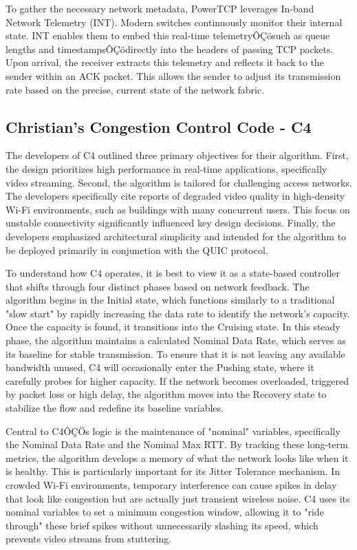 \documentclass[conference]{IEEEtran}
\begin{document}
To gather the necessary network metadata, PowerTCP leverages In-band Network Telemetry (INT)\cite{PowerTCP}. 
Modern switches continuously monitor their internal state.
INT enables them to embed this real-time telemetryÔÇösuch as queue lengths and timestampsÔÇödirectly into the headers of passing TCP packets. 
Upon arrival, the receiver extracts this telemetry and reflects it back to the sender within an ACK packet. 
This allows the sender to adjust its transmission rate based on the precise, current state of the network fabric.

\subsection{Christian's Congestion Control Code - C4}

The developers of C4 outlined three primary objectives for their algorithm\cite{C4BlogPost}. 
First, the design prioritizes high performance in real-time applications, specifically video streaming. 
Second, the algorithm is tailored for challenging access networks.
The developers specifically cite reports of degraded video quality in high-density Wi-Fi environments, such as buildings with many concurrent users. 
This focus on unstable connectivity significantly influenced key design decisions. 
Finally, the developers emphasized architectural simplicity and intended for the algorithm to be deployed primarily in conjunction with the QUIC protocol.

To understand how C4 operates, it is best to view it as a state-based controller that shifts through four distinct phases based on network feedback\cite{C4}. 
The algorithm begins in the Initial state, which functions similarly to a traditional "slow start" by rapidly increasing the data rate to identify the network's capacity. 
Once the capacity is found, it transitions into the Cruising state. In this steady phase, the algorithm maintains a calculated Nominal Data Rate, which serves as its baseline for stable transmission. 
To ensure that it is not leaving any available bandwidth unused, C4 will occasionally enter the Pushing state, where it carefully probes for higher capacity. 
If the network becomes overloaded, triggered by packet loss or high delay, the algorithm moves into the Recovery state to stabilize the flow and redefine its baseline variables.

Central to C4ÔÇÖs logic is the maintenance of "nominal" variables, specifically the Nominal Data Rate and the Nominal Max RTT\cite{C4}. 
By tracking these long-term metrics, the algorithm develops a memory of what the network looks like when it is healthy. 
This is particularly important for its Jitter Tolerance mechanism. 
In crowded Wi-Fi environments, temporary interference can cause spikes in delay that look like congestion but are actually just transient wireless noise.
C4 uses its nominal variables to set a minimum congestion window, allowing it to "ride through" these brief spikes without unnecessarily slashing its speed, which prevents video streams from stuttering.
\end{document}
